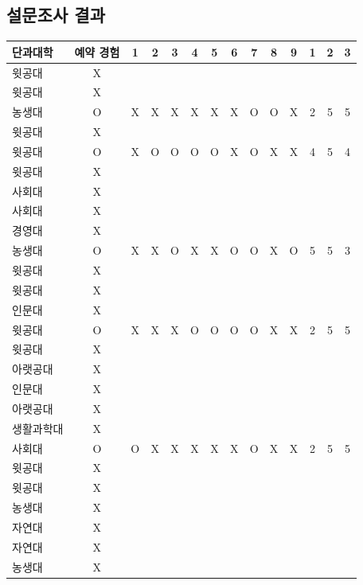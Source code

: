 \documentclass[11pt,a4paper]{article}
\begin{document}
\subsection{설문조사 결과}
\begin{center}
\begin{tabular}{ | p{2cm} | c | c | c | c | c | c | c | c | c | c | c | c | c | }
\hline
단과대학 & 예약 경험 & 1 & 2 & 3 & 4 & 5 & 6 & 7 & 8 & 9 & 1 & 2 & 3 \\
\hline
윗공대 & X & & & & & & & & & & & & \\
윗공대 & X & & & & & & & & & & & & \\
농생대 & O & X & X & X & X & X & X & O & O & X & 2 & 5 & 5 \\
윗공대 & X & & & & & & & & & & & & \\
윗공대 & O & X & O & O & O & O & X & O & X & X & 4 & 5 & 4 \\
윗공대 & X & & & & & & & & & & & & \\
사회대 & X & & & & & & & & & & & & \\
사회대 & X & & & & & & & & & & & & \\
경영대 & X & & & & & & & & & & & & \\
농생대 & O & X & X & O & X & X & O & O & X & O & 5 & 5 & 3 \\
윗공대 & X & & & & & & & & & & & & \\
윗공대 & X & & & & & & & & & & & & \\
인문대 & X & & & & & & & & & & & & \\
윗공대 & O & X & X & X & O & O & O & O & X & X & 2 & 5 & 5 \\
윗공대 & X & & & & & & & & & & & & \\
아랫공대 & X & & & & & & & & & & & & \\
인문대 & X & & & & & & & & & & & & \\
아랫공대 & X & & & & & & & & & & & & \\
생활과학대 & X & & & & & & & & & & & & \\
사회대 & O & O & X & X & X & X & X & O & X & X & 2 & 5 & 5 \\
윗공대 & X & & & & & & & & & & & & \\
윗공대 & X & & & & & & & & & & & & \\
농생대 & X & & & & & & & & & & & & \\
자연대 & X & & & & & & & & & & & & \\
자연대 & X & & & & & & & & & & & & \\
농생대 & X & & & & & & & & & & & & \\

\end{tabular}
\end{center}
\end{document}
